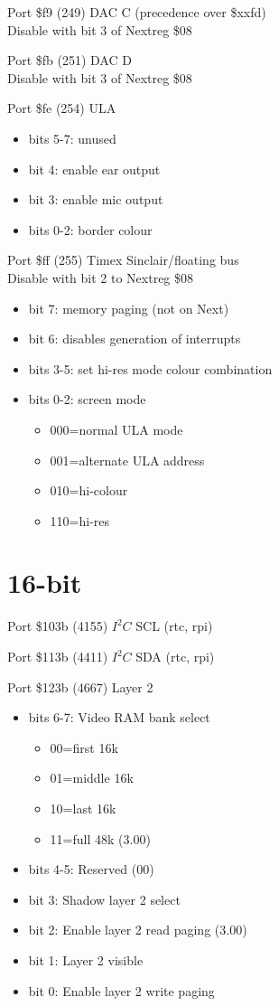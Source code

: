 Port \$f9 (249) DAC C (precedence over \$xxfd)\\
Disable with bit 3 of Nextreg \$08

Port \$fb (251) DAC D\\
Disable with bit 3 of Nextreg \$08

Port \$fe (254) ULA
\begin{itemize}
  \item[] bits 5-7: unused
  \item[] bit 4: enable ear output
  \item[] bit 3: enable mic output
  \item[] bits 0-2: border colour
\end{itemize}

Port \$ff (255) Timex Sinclair/floating bus\\
Disable with bit 2 to Nextreg \$08
\begin{itemize}
\item[] bit 7: memory paging (not on Next)
\item[] bit 6: disables generation of interrupts
\item[] bits 3-5: set hi-res mode colour combination
\item[] bits 0-2: screen mode
  \begin{itemize}
  \item[] 000=normal ULA mode
  \item[] 001=alternate ULA address
  \item[] 010=hi-colour
  \item[] 110=hi-res
  \end{itemize}
\end{itemize}

\section{16-bit}
Port \$103b (4155) $I^2C$ SCL (rtc, rpi)

Port \$113b (4411) $I^2C$ SDA (rtc, rpi)

Port \$123b (4667) Layer 2
\begin{itemize}
\item[] bits 6-7: Video RAM bank select
  \begin{itemize}
  \item[] 00=first 16k
  \item[] 01=middle 16k
  \item[] 10=last 16k
  \item[] 11=full 48k (3.00)
  \end{itemize}
\item[] bits 4-5: Reserved (00)
\item[] bit 3: Shadow layer 2 select
\item[] bit 2: Enable layer 2 read paging (3.00)
\item[] bit 1: Layer 2 visible
\item[] bit 0: Enable layer 2 write paging
\end{itemize}

